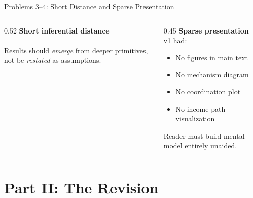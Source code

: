 \documentclass[
  ignorenonframetext,
  aspectratio=169]{beamer}
\begin{document}
\begin{frame}{Problems 3--4: Short Distance and Sparse Presentation}
\protect{}\label{problems-34-short-distance-and-sparse-presentation}
\begin{columns}[T]
\begin{column}{0.52\textwidth}
\textbf{Short inferential distance}\\[4pt]
\\[4pt]
\small Results should \emph{emerge} from deeper primitives, not be \emph{restated} as assumptions.
\end{column}
\begin{column}{0.45\textwidth}
\textbf{Sparse presentation}\\[4pt]
\small v1 had:
\begin{itemize}
  \item No figures in main text
  \item No mechanism diagram
  \item No coordination plot
  \item No income path visualization
\end{itemize}
\vspace{0.1cm}
Reader must build mental model entirely unaided.
\end{column}
\end{columns}
\end{frame}

\section{Part II: The Revision}\label{part-ii-the-revision}
\end{document}
